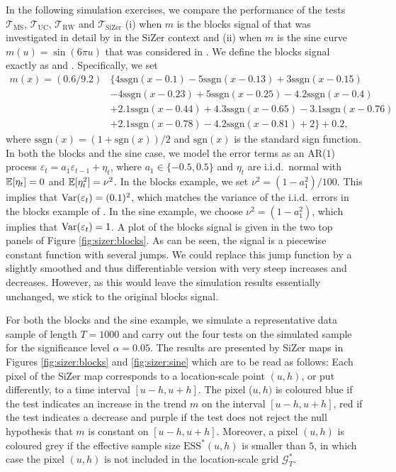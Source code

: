 In the following simulation exercises, we compare the performance of the tests $\mathcal{T}_{\text{MS}}$, $\mathcal{T}_{\text{UC}}$, $\mathcal{T}_{\text{RW}}$ and $\mathcal{T}_{\text{SiZer}}$ (i) when $m$ is the blocks signal of \cite{DonohoJohnstone1995} that was investigated in detail by \cite{HannigMarron2006} in the SiZer context and (ii) when $m$ is the sine curve $m(u) = \sin(6\pi u)$ that was considered in \cite{ParkHannigKang2009}. We define the blocks signal exactly as \cite{MarronAdakJohnstoneNeumannPatil1998} and \cite{HannigMarron2006}. Specifically, we set 
\begin{align*}
m(x) = (0.6/9.2) 
 & \big\{ 4 \text{ssgn}(x-0.1) - 5 \text{ssgn}(x-0.13) + 3 \text{ssgn}(x-0.15) \\ 
 & - 4 \text{ssgn}(x-0.23) + 5 \text{ssgn}(x-0.25) -4.2 \text{ssgn}(x-0.4) \\
 & + 2.1 \text{ssgn}(x-0.44) + 4.3 \text{ssgn} (x-0.65) - 3.1\text{ssgn}(x-0.76) \\
 & + 2.1 \text{ssgn}(x-0.78) - 4.2 \text{ssgn}(x-0.81) + 2 \big\} + 0.2,
\end{align*}
where $\text{ssgn}(x) = (1+\text{sgn}(x))/2$ and $\text{sgn}(x)$ is the standard sign function. In both the blocks and the sine case, we model the error terms as an AR($1$) process $\varepsilon_t = a_1 \varepsilon_{t-1} + \eta_t$, where $a_1 \in\{-0.5,0.5\}$ and $\eta_t$ are i.i.d.\ normal with $\mathbb{E}[\eta_t] = 0$ and $\mathbb{E}[\eta_t^2] = \nu^2$. In the blocks example, we set $\nu^2 = (1-a_1^2)/100$. This implies that $\textnormal{Var}(\varepsilon_t) = (0.1)^2$, which matches the variance of the i.i.d.\ errors in the blocks example of \cite{HannigMarron2006}. In the sine example, we choose $\nu^2 = (1-a_1^2)$, which implies that $\textnormal{Var}(\varepsilon_t) = 1$. A plot of the blocks signal is given in the two top panels of Figure \ref{fig:sizer:blocks}. As can be seen, the signal is a piecewise constant function with several jumps. We could replace this jump function by a slightly smoothed and thus differentiable version with very steep increases and decreases. However, as this would leave the simulation results essentially unchanged, we stick to the original blocks signal.  


For both the blocks and the sine example, we simulate a representative data sample of length $T=1000$ and carry out the four tests on the simulated sample for the significance level $\alpha=0.05$. The results are presented by SiZer maps in Figures \ref{fig:sizer:blocks} and \ref{fig:sizer:sine} which are to be read as follows: Each pixel of the SiZer map corresponds to a location-scale point $(u,h)$, or put differently, to a time interval $[u-h,u+h]$. The pixel ($u,h)$ is coloured blue if the test indicates an increase in the trend $m$ on the interval $[u-h,u+h]$, red if the test indicates a decrease and purple if the test does not reject the null hypothesis that $m$ is constant on $[u-h,u+h]$. Moreover, a pixel $(u,h)$ is coloured grey if the effective sample size $\text{ESS}^*(u,h)$ is smaller than $5$, in which case the pixel $(u,h)$ is not included in the location-scale grid $\mathcal{G}_T^*$.


